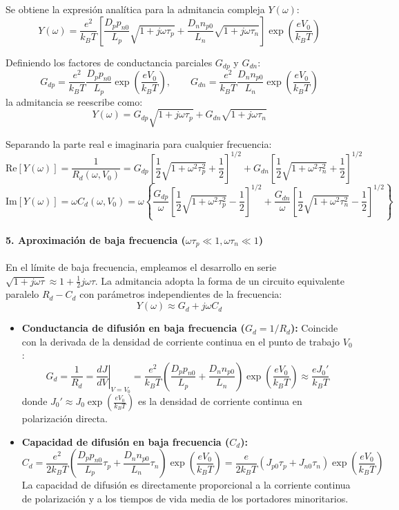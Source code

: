 Se obtiene la expresión analítica para la admitancia compleja $Y(\omega)$:
\[
Y(\omega) = \frac{e^2}{k_B T} \left[ \frac{D_p p_{n0}}{L_p} \sqrt{1 + j\omega \tau_p} + \frac{D_n n_{p0}}{L_n} \sqrt{1 + j\omega \tau_n} \right] \exp\left(\frac{e V_0}{k_B T}\right)
\]

Definiendo los factores de conductancia parciales $G_{dp}$ y $G_{dn}$:
\[
G_{dp} = \frac{e^2}{k_B T} \frac{D_p p_{n0}}{L_p} \exp\left(\frac{e V_0}{k_B T}\right), \qquad G_{dn} = \frac{e^2}{k_B T} \frac{D_n n_{p0}}{L_n} \exp\left(\frac{e V_0}{k_B T}\right)
\]
la admitancia se reescribe como:
\[
Y(\omega) = G_{dp} \sqrt{1 + j\omega \tau_p} + G_{dn} \sqrt{1 + j\omega \tau_n}
\]

Separando la parte real e imaginaria para cualquier frecuencia:
\[
\text{Re}[Y(\omega)] = \frac{1}{R_d(\omega, V_0)} = G_{dp} \left[ \frac{1}{2} \sqrt{1 + \omega^2 \tau_p^2} + \frac{1}{2} \right]^{1/2} + G_{dn} \left[ \frac{1}{2} \sqrt{1 + \omega^2 \tau_n^2} + \frac{1}{2} \right]^{1/2}
\]
\[
\text{Im}[Y(\omega)] = \omega C_d(\omega, V_0) = \omega \left\{ \frac{G_{dp}}{\omega} \left[ \frac{1}{2} \sqrt{1 + \omega^2 \tau_p^2} - \frac{1}{2} \right]^{1/2} + \frac{G_{dn}}{\omega} \left[ \frac{1}{2} \sqrt{1 + \omega^2 \tau_n^2} - \frac{1}{2} \right]^{1/2} \right\}
\]

\newpage
\paragraph{5. Aproximación de baja frecuencia ($\omega \tau_p \ll 1, \omega \tau_n \ll 1$)}
En el límite de baja frecuencia, empleamos el desarrollo en serie $\sqrt{1 + j\omega \tau} \approx 1 + \frac{1}{2} j \omega \tau$. La admitancia adopta la forma de un circuito equivalente paralelo $R_d - C_d$ con parámetros independientes de la frecuencia:
\[
Y(\omega) \approx G_d + j \omega C_d
\]

\begin{itemize}
    \item \textbf{Conductancia de difusión en baja frecuencia ($G_d = 1/R_d$):}
    Coincide con la derivada de la densidad de corriente continua en el punto de trabajo $V_0$:
    \[
    G_d = \frac{1}{R_d} = \left. \frac{d J}{d V} \right|_{V=V_0} = \frac{e^2}{k_B T} \left( \frac{D_p p_{n0}}{L_p} + \frac{D_n n_{p0}}{L_n} \right) \exp\left(\frac{e V_0}{k_B T}\right) \approx \frac{e J_0'}{k_B T}
    \]
    donde $J_0' \approx J_0 \exp\left(\frac{e V_0}{k_B T}\right)$ es la densidad de corriente continua en polarización directa.

    \item \textbf{Capacidad de difusión en baja frecuencia ($C_d$):}
    \[
    C_d = \frac{e^2}{2 k_B T} \left( \frac{D_p p_{n0}}{L_p} \tau_p + \frac{D_n n_{p0}}{L_n} \tau_n \right) \exp\left(\frac{e V_0}{k_B T}\right) = \frac{e}{2 k_B T} \left( J_{p0} \tau_p + J_{n0} \tau_n \right) \exp\left(\frac{e V_0}{k_B T}\right)
    \]
    La capacidad de difusión es directamente proporcional a la corriente continua de polarización y a los tiempos de vida media de los portadores minoritarios.
\end{itemize}

